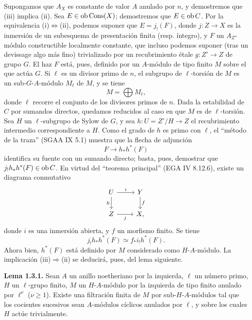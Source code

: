 Supongamos que $A_X$ es constante de valor $A$ anulado por $n$, y demostremos que (iii) implica (ii). Sea $E\in\operatorname{ob}\operatorname{Cons}(X)$; demostremos que $E\in\operatorname{ob} C$. Por la equivalencia (i)$\Leftrightarrow$(ii), podemos suponer que $E=j_!(F)$, donde $j:Z\to X$ es la inmersión de un subesquema de presentación finita (resp. íntegro), y $F$ un $A_Z$-módulo constructible localmente constante, que incluso podemos suponer (tras un devissage algo más fino) trivializado por un recubrimiento étale $g:Z'\to Z$ de grupo $G$. El haz $F$ está, pues, definido por un $A$-módulo de tipo finito $M$ sobre el que actúa $G$. Si $\ell$ es un divisor primo de $n$, el subgrupo de $\ell$-torsión de $M$ es un sub-$G$-$A$-módulo $M_\ell$ de $M$, y se tiene
\[
        M=\bigoplus M_\ell,
\]
donde $\ell$ recorre el conjunto de los divisores primos de $n$. Dada la estabilidad de $C$ por sumandos directos, quedamos reducidos al caso en que $M$ es de $\ell$-torsión. Sea $H$ un $\ell$-subgrupo de Sylow de $G$, y sea $h:U=Z'/H\to Z$ el recubrimiento intermedio correspondiente a $H$. Como el grado de $h$ es primo con $\ell$, el ``método de la traza'' (SGAA IX 5.1) muestra que la flecha de adjunción
\[
        F\longrightarrow h_*h^*(F)
\]
identifica su fuente con un sumando directo; basta, pues, demostrar que $j_!h_*h^*(F)\in\operatorname{ob} C$. En virtud del ``teorema principal'' (EGA IV 8.12.6), existe un diagrama conmutativo
\[
\begin{tikzcd}
U \arrow[r,"i"] \arrow[d,"h"'] & Y \arrow[d,"f"]\\
Z \arrow[r,"j"'] & X,
\end{tikzcd}
\]
donde $i$ es una inmersión abierta, y $f$ un morfismo finito. Se tiene
\[
        j_!h_*h^*(F) \simeq f_* i_! h^*(F).
\]
Ahora bien, $h^*(F)$ está definido por $M$ considerado como $H$-$A$-módulo. La implicación (iii)$\Rightarrow$(ii) se deducirá, pues, del lema siguiente.

\textbf{Lema 1.3.1.} Sean $A$ un anillo noetheriano por la izquierda, $\ell$ un número primo, $H$ un $\ell$-grupo finito, $M$ un $H$-$A$-módulo por la izquierda de tipo finito anulado por $\ell^\nu$ ($\nu\geq 1$). Existe una filtración finita de $M$ por sub-$H$-$A$-módulos tal que los cocientes sucesivos sean $A$-módulos cíclicos anulados por $\ell$, y sobre los cuales $H$ actúe trivialmente.


